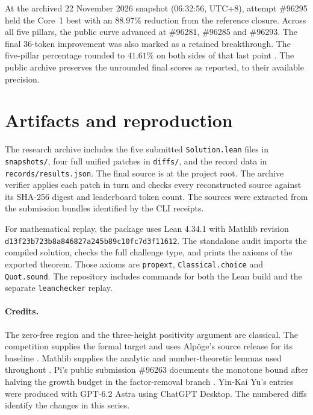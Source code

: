 \documentclass[11pt,a4paper]{article}
\newcommand{\lean}[1]{\nolinkurl{#1}}
\begin{document}
At the archived 22 November 2026 snapshot (06:32:56, UTC+8), attempt
\#96295 held the Core~1 best with an \(88.97\%\) reduction from the
reference closure. Across all five pillars, the public curve advanced at
\#96281, \#96285 and \#96293. The final 36-token improvement was also marked
as a retained breakthrough. The five-pillar percentage rounded to \(41.61\%\)
on both sides of that last point \cite{records}. The public archive preserves
the unrounded final scores as reported, to their available precision.

\section{Artifacts and reproduction}
The research archive \cite{archive} includes the five submitted
\lean{Solution.lean} files in \lean{snapshots/}, four full unified patches
in \lean{diffs/}, and the record data in \lean{records/results.json}.
The final source is at the project root. The archive verifier applies
each patch in turn and checks every reconstructed source against its
SHA-256 digest and leaderboard token count. The sources were extracted
from the submission bundles identified by the CLI receipts.

For mathematical replay, the package uses Lean 4.34.1 with Mathlib
revision \lean{d13f23b723b8a846827a245b89c10fc7d3f11612}.
The standalone audit imports the compiled solution, checks the full
challenge type, and prints the axioms of the exported theorem. Those
axioms are \lean{propext}, \lean{Classical.choice} and \lean{Quot.sound}.
The repository includes commands for both the Lean build and the
separate \lean{leanchecker} replay.

\paragraph{Credits.}
The zero-free region and the three-height positivity argument are classical.
The competition supplies the formal target and uses Alp\"oge's source
release for its baseline \cite{alpoge}.
Mathlib supplies the analytic and number-theoretic lemmas used throughout
\cite{mathlib,bc}. Pi's public submission \#96263 documents the monotone
bound after halving the growth budget in the factor-removal branch
\cite{pi}. Yin-Kai Yu's entries were produced with GPT-6.2 Astra using
ChatGPT Desktop. The numbered diffs identify the changes in this series.
\end{document}
